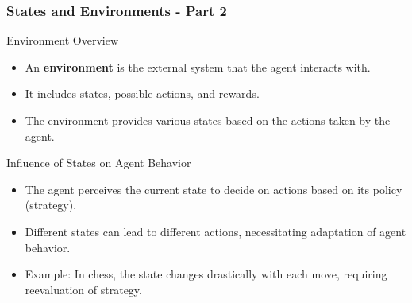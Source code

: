 \documentclass{beamer}
\begin{document}
\begin{frame}[fragile]
    \frametitle{States and Environments - Part 2}
    \begin{block}{Environment Overview}
        \begin{itemize}
            \item An \textbf{environment} is the external system that the agent interacts with.
            \item It includes states, possible actions, and rewards.
            \item The environment provides various states based on the actions taken by the agent.
        \end{itemize}
    \end{block}
    
    \begin{block}{Influence of States on Agent Behavior}
        \begin{itemize}
            \item The agent perceives the current state to decide on actions based on its policy (strategy).
            \item Different states can lead to different actions, necessitating adaptation of agent behavior.
            \item Example: In chess, the state changes drastically with each move, requiring reevaluation of strategy.
        \end{itemize}
    \end{block}
\end{frame}
\end{document}

